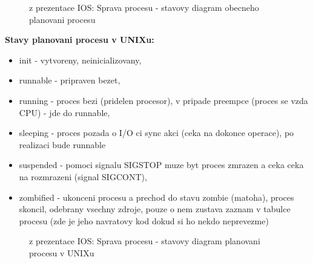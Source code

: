 \documentclass[a4paper, 11pt]{article}
\begin{document}
\begin{figure} [ht]
    \centering
    \caption{z prezentace IOS: Sprava procesu - stavovy diagram obecneho planovani procesu}
\end{figure}

\newpage

\textbf{Stavy planovani procesu v UNIXu:}
\begin{itemize}
    \item init - vytvoreny, neinicializovany,
    \item runnable - pripraven bezet,
    \item running - proces bezi (pridelen procesor), v pripade preempce (proces se vzda CPU) - jde do runnable,
    \item sleeping - proces pozada o I/O ci sync akci (ceka na dokonce operace), po realizaci bude runnable
    \item suspended - pomoci signalu SIGSTOP muze byt proces zmrazen a ceka ceka na rozmrazeni (signal SIGCONT),
    \item zombified - ukonceni procesu a prechod do stavu zombie (matoha), proces skoncil, odebrany vsechny zdroje, pouze o nem zustava zaznam v tabulce procesu (zde je jeho navratovy kod dokud si ho nekdo neprevezme) \\
\end{itemize}

\begin{figure} [ht]
    \centering
    \caption{z prezentace IOS: Sprava procesu - stavovy diagram planovani procesu v UNIXu}
\end{figure}
\end{document}

